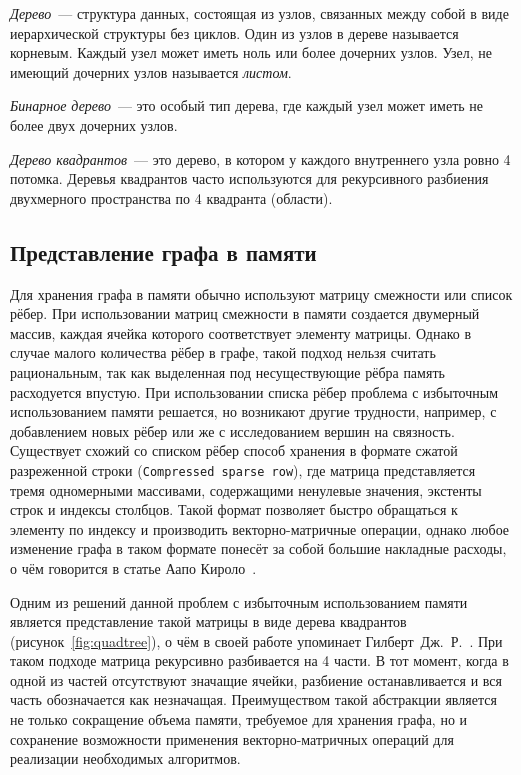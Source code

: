 \textit{Дерево}~--- структура данных, состоящая из узлов, связанных между собой в виде иерархической структуры без циклов. Один из узлов в дереве называется корневым. Каждый узел может иметь ноль или более дочерних узлов. Узел, не имеющий дочерних узлов называется \textit{листом}.

\textit{Бинарное дерево}~---  это особый тип дерева, где каждый узел может иметь не более двух дочерних узлов.

\textit{Дерево квадрантов}~--- это дерево, в котором у каждого внутреннего узла ровно 4 потомка. Деревья квадрантов часто используются для рекурсивного разбиения двухмерного пространства по 4 квадранта (области).

\subsection{Представление графа в памяти}
Для хранения графа в памяти обычно используют матрицу смежности или список рёбер. При использовании матриц смежности в памяти создается двумерный массив, каждая ячейка которого соответствует элементу матрицы. Однако в случае малого количества рёбер в графе, такой подход нельзя считать рациональным, так как выделенная под несуществующие рёбра память расходуется впустую. При использовании списка рёбер проблема с избыточным использованием памяти решается, но возникают другие трудности, например, с добавлением новых рёбер или же с исследованием вершин на связность. Существует схожий со списком рёбер способ хранения в формате сжатой разреженной строки (\texttt{Compressed sparse row}), где матрица представляется тремя одномерными массивами, содержащими ненулевые значения, экстенты строк и индексы столбцов. Такой формат позволяет быстро обращаться к элементу по индексу и производить векторно-матричные операции, однако любое изменение графа в таком формате понесёт за собой большие накладные расходы, о чём говорится в статье Аапо Кироло~\cite{10.5555/2387880.2387884}.

Одним из решений данной проблем с избыточным использованием памяти является представление такой матрицы в виде дерева квадрантов (рисунок~\ref{fig:quadtree}), о чём в своей работе упоминает Гилберт~Дж.~Р.~\cite{bulucc2012parallel}. При таком подходе матрица рекурсивно разбивается на 4 части. В тот момент, когда в одной из частей отсутствуют значащие ячейки, разбиение останавливается и вся часть обозначается как незначащая. Преимуществом такой абстракции является не только сокращение объема памяти, требуемое для хранения графа, но и сохранение возможности применения векторно-матричных операций для реализации необходимых алгоритмов.

